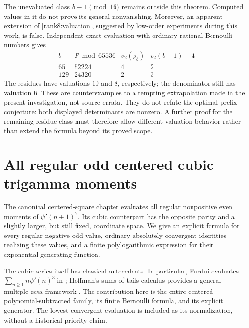 \documentclass[11pt,letterpaper]{article}
\theoremstyle{definition}
\theoremstyle{remark}
\numberwithin{equation}{section}
\begin{document}
The unevaluated class $b\equiv1\pmod {16}$ remains outside this
theorem.  Computed values in it do not prove its general nonvanishing.
Moreover, an apparent extension of \eqref{rank8:valuation}, suggested
by low-order experiments during this work, is false.  Independent
exact evaluation with ordinary rational Bernoulli numbers gives
\[
 \begin{array}{c|c|c|c}
 b&P\bmod 65536&v_2(\rho_b)&v_2(b-1)-4\\\hline
 65&52224&4&2\\
 129&24320&2&3
 \end{array}
\]
The residues have valuations $10$ and $8$, respectively; the
denominator still has valuation $6$.  These are counterexamples
to a tempting extrapolation made in the present investigation,
not source errata.  They do not refute the optimal-prefix conjecture:
both displayed determinants are nonzero.  A further proof for the
remaining residue class must therefore allow different valuation
behavior rather than extend the formula beyond its proved scope.




\section{All regular odd centered cubic trigamma moments}
\label{cc:sec}

The canonical centered-square chapter evaluates all regular nonpositive
even moments of $\psi'(n+1)^2$.  Its cubic counterpart has the opposite
parity and a slightly larger, but still fixed, coordinate space.  We give
an explicit formula for every regular negative odd value, ordinary
absolutely convergent identities realizing these values, and a finite
polylogarithmic expression for their exponential generating function.

The cubic series itself has classical antecedents.  In particular,
Furdui evaluates $\sum_{n\ge1}n\psi'(n)^3$ in
\cite[Theorem 1(b)]{cc:furdui2015}; Hoffman's sums-of-tails calculus
provides a general multiple-zeta framework \cite{cc:hoffman2016}.
The contribution here is the entire centered polynomial-subtracted
family, its finite Bernoulli formula, and its explicit generator.
The lowest convergent evaluation is included as its normalization,
without a historical-priority claim.
\end{document}
